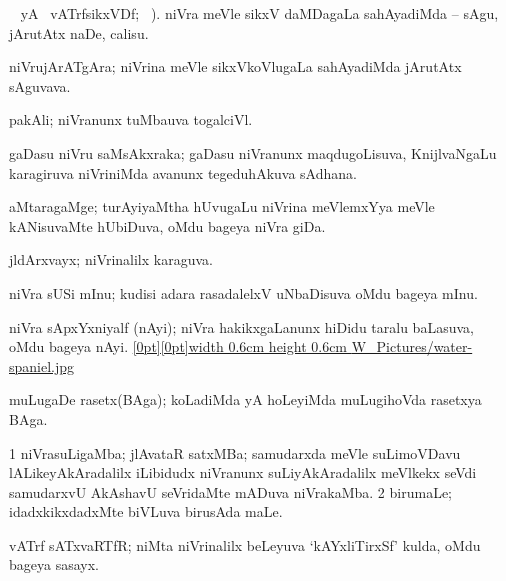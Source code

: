 {\bentry
{} 
\gl{\akirx}
 \BUkaq\  yA  \ucAcx\ vATrfsikxVDf; \vakaq\ ). \bmng
niVra meVle sikxV daMDagaLa sahAyadiMda -- sAgu, jArutAtx naDe, calisu. 
\emng
\eentry

\bentry
{} 
\gl{\nA}
\expl{}
\bmng
niVrujArATgAra; niVrina meVle sikxVkoVlugaLa sahAyadiMda jArutAtx sAguvava. 
\emng
\eentry

\bentry
{} 
\gl{\nA}
\expl{}
\bmng
pakAli; niVranunx tuMbauva togalciVl. 
\emng
\eentry

\bentry
{} 
\gl{\nA}
\expl{}
\bmng
gaDasu niVru saMsAkxraka; gaDasu niVranunx maqdugoLisuva, KnijlvaNgaLu karagiruva niVriniMda avanunx tegeduhAkuva sAdhana. 
\emng
\eentry

\bentry
{} 
\gl{\nA}
\expl{}
\bmng
aMtaragaMge; turAyiyaMtha hUvugaLu niVrina meVlemxYya meVle kANisuvaMte hUbiDuva, oMdu bageya niVra giDa. 
\emng
\eentry

\bentry
{} 
\gl{\gu}
\expl{}
\bmng
jldArxvayx; niVrinalilx karaguva. 
\emng
\eentry

\bentry
{} 
\gl{\nA}
\expl{}
\bmng
niVra sUSi mInu; kudisi adara rasadalelxV uNbaDisuva oMdu bageya mInu. 
\emng
\eentry

\bentry
{} 
\gl{\nA}
\expl{}
\bmng
niVra sApxYxniyalf (nAyi); niVra hakikxgaLanunx hiDidu taralu baLasuva, oMdu bageya nAyi. \quad \hyperlink{water-spanielfigure}{\raisebox{-0.15cm}[0pt][0pt]{\pdfimage width 0.6cm height 0.6cm {W_Pictures/water-spaniel.jpg}}} 
\emng
\eentry

\bentry
{} 
\gl{\nA}
\expl{}
\bmng
muLugaDe rasetx(BAga); koLadiMda yA hoLeyiMda muLugihoVda rasetxya BAga. 
\emng
\eentry

\bentry
{} 
\gl{\nA}
\expl{}
\bmng
\bnum
\num{1} niVrasuLigaMba; jlAvataR satxMBa; samudarxda meVle suLimoVDavu lALikeyAkAradalilx iLibidudx niVranunx suLiyAkAradalilx meVlkekx seVdi samudarxvU AkAshavU seVridaMte mADuva niVrakaMba. 
\num{2} birumaLe; idadxkikxdadxMte biVLuva birusAda maLe. 
\enum
\emng
\eentry

\bentry
{} 
\gl{\nA}
\expl{}
\bmng
vATrf sATxvaRTfR; niMta niVrinalilx beLeyuva `kAYxliTirxSf' kulda, oMdu bageya sasayx. 
\emng
\eentry

}
